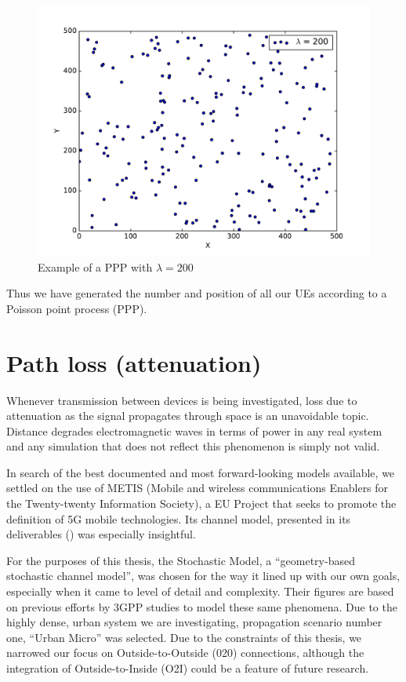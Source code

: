 \begin{figure}[!h]
\centering
\includegraphics[scale = 0.6]{figures/PPP}
\caption{Example of a PPP with $\lambda = 200$}
\end{figure}

Thus we have generated the number and position of all our UEs according to a Poisson point process (PPP).

\section{Path loss (attenuation)} \label{PL}
Whenever transmission between devices is being investigated, loss due to attenuation as the signal propagates through space is an unavoidable topic. Distance degrades electromagnetic waves in terms of power in any real system and any simulation that does not reflect this phenomenon is simply not valid. 

In search of the best documented and most forward-looking models available, we settled on the use of METIS (Mobile and wireless communications Enablers for the Twenty-twenty Information Society), a EU Project that seeks to promote the definition of 5G mobile technologies. Its channel model, presented in its deliverables (\cite{Raschkowski}) was especially insightful. 

For the purposes of this thesis, the Stochastic Model, a ``geometry-based stochastic channel model'', was chosen for the way it lined up with our own goals, especially when it came to level of detail and complexity. Their figures are based on previous efforts by 3GPP studies to model these same phenomena. Due to the highly dense, urban system we are investigating, propagation scenario number one, ``Urban Micro'' was selected. Due to the constraints of this thesis, we narrowed our focus on Outside-to-Outside (020) connections, although the integration of Outside-to-Inside (O2I) could be a feature of future research.

